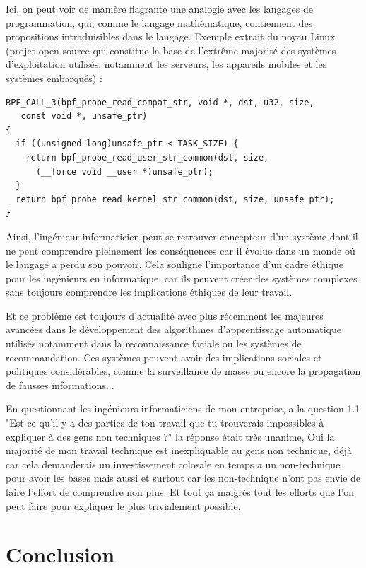 \documentclass[12pt,a4paper]{report}
\begin{document}
Ici, on peut voir de manière flagrante une analogie avec les langages de programmation, qui, comme le langage mathématique, contiennent des propositions intraduisibles dans le langage. Exemple extrait du noyau Linux (projet open source qui constitue la base de l'extrême majorité des systèmes d'exploitation utilisés, notamment les serveurs, les appareils mobiles et les systèmes embarqués) :

\begin{verbatim}
BPF_CALL_3(bpf_probe_read_compat_str, void *, dst, u32, size,
   const void *, unsafe_ptr)
{
  if ((unsigned long)unsafe_ptr < TASK_SIZE) {
    return bpf_probe_read_user_str_common(dst, size,
      (__force void __user *)unsafe_ptr);
  }
  return bpf_probe_read_kernel_str_common(dst, size, unsafe_ptr);
}
\end{verbatim}

Ainsi, l'ingénieur informaticien peut se retrouver concepteur d'un système dont il ne peut comprendre pleinement les conséquences car il évolue dans un monde où le langage a perdu son pouvoir. Cela souligne l'importance d'un cadre éthique pour les ingénieurs en informatique, car ils peuvent créer des systèmes complexes sans toujours comprendre les implications éthiques de leur travail.

Et ce problème est toujours d'actualité avec plus récemment les majeures avancées dans le développement des algorithmes d'apprentissage automatique utilisés notamment dans la reconnaissance faciale ou les systèmes de recommandation. Ces systèmes peuvent avoir des implications sociales et politiques considérables, comme la surveillance de masse ou encore la propagation de fausses informations...

En questionnant les ingénieurs informaticiens de mon entreprise, a la question 1.1 "Est-ce qu'il y a des parties de ton travail que tu trouverais impossibles à expliquer à des gens non techniques ?" 
la réponse était très unanime, Oui la majorité de mon travail technique est inexpliquable au gens non technique, déjà car cela demanderais un investissement colosale en temps a un non-technique pour avoir les bases mais aussi et surtout car les non-technique n'ont pas envie de faire l'effort de comprendre non plus. Et tout ça malgrès tout les efforts que l'on peut faire pour expliquer le plus trivialement possible. 

\chapter{Conclusion}
\end{document}
